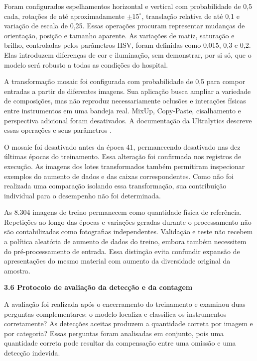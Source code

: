 Foram configurados espelhamentos horizontal e vertical com probabilidade de 0,5 cada, rotações de até aproximadamente $\pm15^{\circ}$, translação relativa de até 0,1 e variação de escala de 0,25. Essas operações procuram representar mudanças de orientação, posição e tamanho aparente. As variações de matiz, saturação e brilho, controladas pelos parâmetros HSV, foram definidas como 0,015, 0,3 e 0,2. Elas introduzem diferenças de cor e iluminação, sem demonstrar, por si só, que o modelo será robusto a todas as condições do hospital.

A transformação mosaic foi configurada com probabilidade de 0,5 para compor entradas a partir de diferentes imagens. Sua aplicação busca ampliar a variedade de composições, mas não reproduz necessariamente oclusões e interações físicas entre instrumentos em uma bandeja real. MixUp, Copy-Paste, cisalhamento e perspectiva adicional foram desativados. A documentação da Ultralytics descreve essas operações e seus parâmetros \parencite{ultralyticsAugmentation}.

O mosaic foi desativado antes da época 41, permanecendo desativado nas dez últimas épocas do treinamento. Essa alteração foi confirmada nos registros de execução. As imagens dos lotes transformados também permitiram inspecionar exemplos do aumento de dados e das caixas correspondentes. Como não foi realizada uma comparação isolando essa transformação, sua contribuição individual para o desempenho não foi determinada.

As 8.304 imagens de treino permanecem como quantidade física de referência. Repetições ao longo das épocas e variações geradas durante o processamento não são contabilizadas como fotografias independentes. Validação e teste não recebem a política aleatória de aumento de dados do treino, embora também necessitem do pré-processamento de entrada. Essa distinção evita confundir expansão de apresentações do mesmo material com aumento da diversidade original da amostra.

\vspace{\baselineskip}
{}
\noindent\textbf{3.6 Protocolo de avaliação da detecção e da contagem}\par
\nobreak\vspace{\baselineskip}\nobreak

A avaliação foi realizada após o encerramento do treinamento e examinou duas perguntas complementares: o modelo localiza e classifica os instrumentos corretamente? As detecções aceitas produzem a quantidade correta por imagem e por categoria? Essas perguntas foram analisadas em conjunto, pois uma quantidade correta pode resultar da compensação entre uma omissão e uma detecção indevida.

